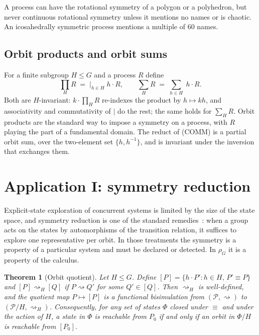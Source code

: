 \documentclass[11pt]{article}
\newtheorem{theorem}{Theorem}[section]
\theoremstyle{definition}
\theoremstyle{remark}
\newcommand{\calc}{\rho_G}
\newcommand{\act}[2]{#1\cdot #2}
\newcommand{\red}{\rightsquigarrow}
\newcommand{\scong}{\equiv}
\newcommand{\Proc}{\mathcal{P}}
\begin{document}
A process can have the rotational symmetry of a polygon or a polyhedron, but
never continuous rotational symmetry unless it mentions no names or is
chaotic. An icosahedrally symmetric process mentions a multiple of $60$ names.

\subsection{Orbit products and orbit sums}

For a finite subgroup $H\le G$ and a process $R$ define
\[
\textstyle\prod_H R \;=\; \big|_{h\in H}\;\act{h}{R},
\qquad
\sum_H R \;=\; \sum_{h\in H}\;\act{h}{R}.
\]
Both are $H$-invariant: $\act{k}{\prod_H R}$ re-indexes the product by
$h\mapsto kh$, and associativity and commutativity of $\mid$ do the rest; the
same holds for $\sum_H R$. Orbit products are the standard way to impose a
symmetry on a process, with $R$ playing the part of a fundamental domain. The
reduct of (COMM) is a partial orbit sum, over the two-element set
$\{h,h^{-1}\}$, and is invariant under the inversion that exchanges them.

\section{Application I: symmetry reduction}\label{sec:reduction}

Explicit-state exploration of concurrent systems is limited by the size of the
state space, and symmetry reduction is one of the standard
remedies~\cite{emerson-sistla,ip-dill,clarke-sym}: when a group acts on the
states by automorphisms of the transition relation, it suffices to explore one
representative per orbit. In those treatments the symmetry is a property of
a particular system and must be declared or detected. In $\calc$ it is a
property of the calculus.

\begin{theorem}[Orbit quotient]\label{thm:quotient}
Let $H\le G$. Define $[P]=\{\act{h}{P'} : h\in H,\, P'\scong P\}$ and
$[P]\red_H[Q]$ if $P\red Q'$ for some $Q'\in[Q]$. Then $\red_H$ is
well-defined, and the quotient map $P\mapsto[P]$ is a functional
bisimulation from $(\Proc,\red)$ to $(\Proc/H,\red_H)$. Consequently, for any
set of states $\Phi$ closed under $\scong$ and under the action of $H$, a state
in $\Phi$ is reachable from $P_0$ if and only if an orbit in $\Phi/H$ is
reachable from $[P_0]$.
\end{theorem}
\end{document}
